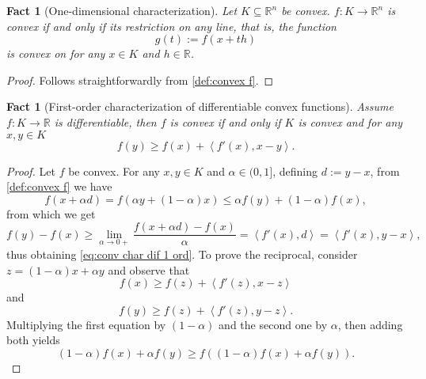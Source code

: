 \documentclass[smallextended,numbook,nospthms]{svjour3}
\theoremstyle{plain}
\newtheorem{fact}[theorem]{Fact}
\theoremstyle{definition}
\def\RR{\mathds R}
\newcommand{\scal}[2]{\left\langle{#1},{#2}  \right\rangle}
\begin{document}
\begin{fact}[One-dimensional characterization]\label{fact:conv 1 dim char}
	Let $K \subseteq \RR^n$ be convex. $f:K \rightarrow \RR^n$ is convex if and only if its restriction on any line, that is, the function
	$$
	g(t):=f(x+th)
	$$
	is convex on for any $x \in K$ and $h \in \RR$.
\end{fact} 
\begin{proof}
	Follows straightforwardly from \cref{def:convex f}.
\end{proof}

\begin{fact}[First-order characterization of differentiable convex functions]\label{fact:conv char dif 1 ord}
	Assume $f:K\rightarrow \RR$ is differentiable, then $f$ is convex if and only if $K$ is convex and for any $x, y \in K$
	$$
	f(y) \geq f(x)+\scal{f'(x)}{x-y}. \label{eq:conv char dif 1 ord}
	$$
\end{fact}
\begin{proof}
Let $f$ be convex. For any $x, y \in K$ and $\alpha \in (0,1]$, defining $d:=y-x$, from \cref{def:convex f} we have
\[
f(x + \alpha d)=f(\alpha y + (1-\alpha)x) \leq \alpha f(y) + (1-\alpha)f(x),
\]
from which we get
\[
f(y)-f(x) \geq \lim_{\alpha \rightarrow 0+} \frac{f(x+\alpha d)-f(x)}{\alpha}=\scal{f'(x)}{d}=\scal{f'(x)}{y-x},
\]
thus obtaining \cref{eq:conv char dif 1 ord}.
To prove the reciprocal, consider $z=(1-\alpha)x+\alpha y$ and observe that
\[
f(x) \geq f(z) + \scal{f'(z)}{x-z}
\]
and
\[
f(y) \geq f(z) + \scal{f'(z)}{y-z}.
\]
Multiplying the first equation by $(1-\alpha)$ and the second one by $\alpha$, then adding both yields
\[
(1-\alpha)f(x)+\alpha f(y) \geq f\left((1-\alpha)f(x) + \alpha f(y)\right).
\]
\end{proof}
\end{document}
